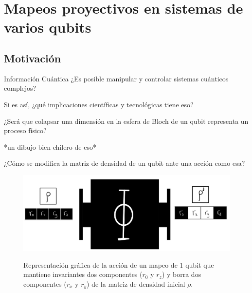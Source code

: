 \documentclass[11pt]{beamer}
\begin{document}
\section{Mapeos proyectivos en sistemas de varios qubits}
\subsection{Motivación}
\begin{frame}{Información Cuántica}
  ¿Es posible manipular y controlar sistemas cuánticos complejos?
	
	Si es así, ¿qué implicaciones científicas	y tecnológicas tiene eso?
\end{frame}

\begin{frame}
¿Será que colapsar una dimensión en la esfera de Bloch de un qubit 
representa un proceso físico? \vfill

*un dibujo bien chilero de eso*
\end{frame}


\begin{frame}
¿Cómo se modifica la matriz de densidad de un qubit ante una acción como esa?

\begin{figure}[H]
\centering
\includegraphics[width=0.9\linewidth]{img-congreso/ja.pdf}
\label{fig:1qubit-draw}
\caption{Representación gráfica de la acción de un mapeo de 1 qubit que 
mantiene invariantes dos componentes ($r_0$ y $r_z$) y borra dos 
componentes ($r_x$ y $r_y$) de la matriz de densidad inicial $\rho$.}
\end{figure}

\end{frame}
\end{document}
